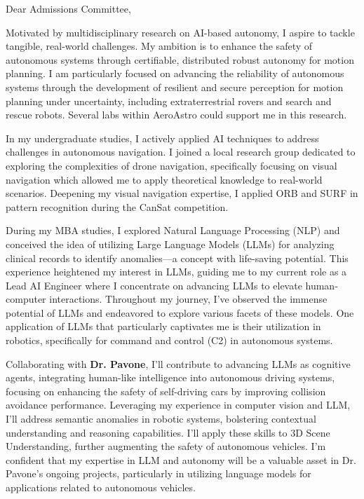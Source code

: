 \documentclass[a4,20pt]{article}
\begin{document}
\begin{large} 
Dear Admissions Committee,

Motivated by multidisciplinary research on AI-based autonomy, I aspire to tackle tangible, real-world challenges. My ambition is to enhance the safety of autonomous systems through certifiable, distributed robust autonomy for motion planning. I am particularly focused on advancing the reliability of autonomous systems through the development of resilient and secure perception for motion planning under uncertainty, including extraterrestrial rovers and search and rescue robots. Several labs within AeroAstro could support me in this research.

In my undergraduate studies, I actively applied AI techniques to address challenges in autonomous navigation. I joined a local research group dedicated to exploring the complexities of drone navigation, specifically focusing on visual navigation which allowed me to apply theoretical knowledge to real-world scenarios. Deepening my visual navigation expertise, I applied ORB and SURF in pattern recognition during the CanSat competition.


During my MBA studies, I explored Natural Language Processing (NLP) and conceived the idea of utilizing Large Language Models (LLMs) for analyzing clinical records to identify anomalies—a concept with life-saving potential. This experience heightened my interest in LLMs, guiding me to my current role as a Lead AI Engineer where I concentrate on advancing LLMs to elevate human-computer interactions. Throughout my journey, I've observed the immense potential of LLMs and endeavored to explore various facets of these models. One application of LLMs that particularly captivates me is their utilization in robotics, specifically for command and control (C2) in autonomous systems.

Collaborating with \textbf{Dr. Pavone}, I'll contribute to advancing LLMs as cognitive agents, integrating human-like intelligence into autonomous driving systems, focusing on enhancing the safety of self-driving cars by improving collision avoidance performance. Leveraging my experience in computer vision and LLM, I'll address semantic anomalies in robotic systems, bolstering contextual understanding and reasoning capabilities. I’ll apply these skills to 3D Scene Understanding, further augmenting the safety of autonomous vehicles. I'm confident that my expertise in LLM and autonomy will be a valuable asset in Dr. Pavone's ongoing projects, particularly in utilizing language models for applications related to autonomous vehicles.


\end{large}
\end{document}
